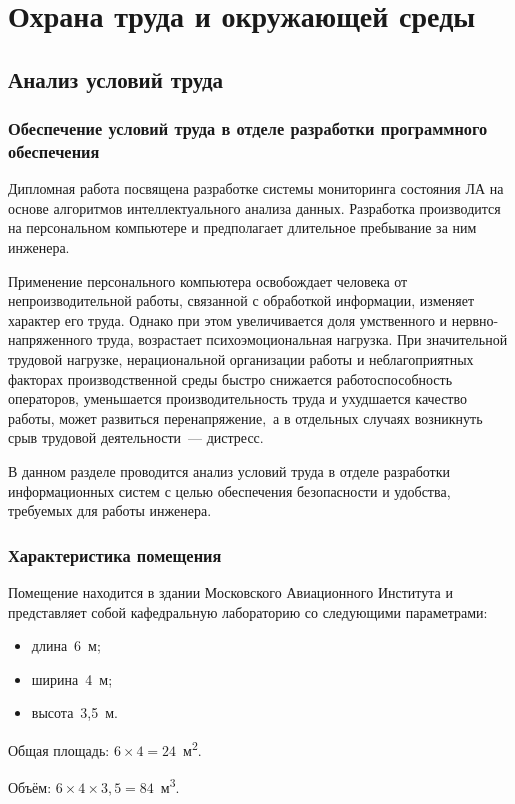 \chapter{Охрана труда и окружающей среды}
\section{Анализ условий труда}
\subsection{Обеспечение условий труда в отделе разработки программного обеспечения}
Дипломная работа посвящена разработке системы мониторинга состояния ЛА на основе алгоритмов интеллектуального анализа данных. Разработка производится на персональном компьютере и предполагает длительное пребывание за ним инженера.

Применение персонального компьютера освобождает человека от непроизводительной работы, связанной с обработкой информации, изменяет характер его труда. Однако при этом увеличивается доля умственного и нервно-напряженного труда, возрастает психоэмоциональная нагрузка. При значительной трудовой нагрузке, нерациональной организации работы и неблагоприятных факторах производственной среды быстро снижается работоспособность операторов, уменьшается производительность труда и ухудшается качество работы, может развиться перенапряжение,~а в отдельных случаях возникнуть срыв трудовой деятельности~--- дистресс.

В данном разделе проводится анализ условий труда в отделе разработки информационных систем с целью обеспечения безопасности и удобства, требуемых для работы инженера.

\subsection{Характеристика помещения}
Помещение находится в здании Московского Авиационного Института и представляет собой кафедральную лабораторию со следующими параметрами:
\begin{itemize}
	\item длина~6~м;
	\item ширина~4~м;
	\item высота~3,5~м.
\end{itemize}

Общая площадь: $6\times4 = 24$~м\textsuperscript{2}.

Объём: $6\times4\times3,5 = 84$~м\textsuperscript{3}.

